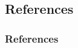 \documentclass{beamer}
\begin{document}
\begin{frame}
\section{References}
\frametitle{References}
\scriptsize


\end{frame}
\end{document}
